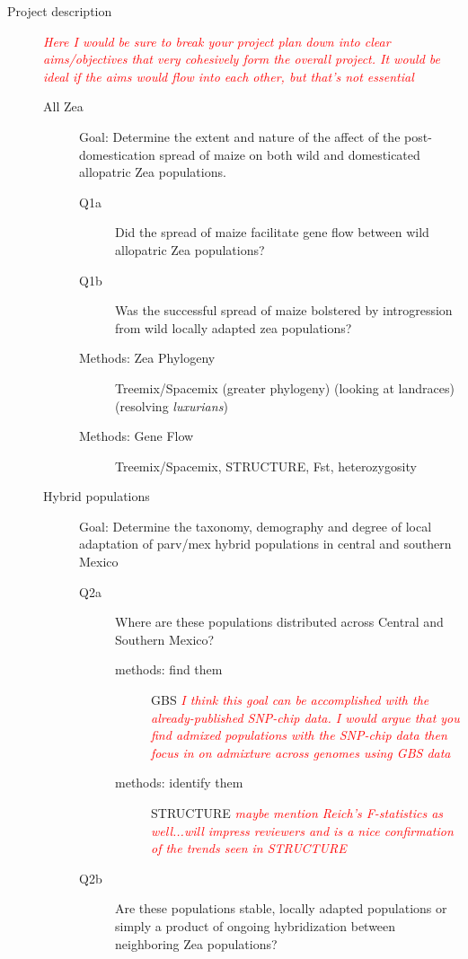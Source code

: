 \documentclass[11pt]{amsart}
\newcommand{\mbh}[1]{\textcolor{red}{ \emph{\scriptsize  #1}} }
\begin{document}
\begin{description}
\begin{itemize}
		\end{itemize}
	\item[Project description] \hfill
	\mbh{Here I would be sure to break your project plan down into clear aims/objectives that very cohesively form the overall project.  It would be ideal if the aims would flow into each other, but that's not essential}
		\begin{description}
			\item[All Zea] Goal: Determine the extent and nature of the affect of the post-domestication spread of maize on both wild and domesticated allopatric Zea populations.
				\begin{description}
					\item[Q1a] Did the spread of maize facilitate gene flow between wild allopatric Zea populations?
					\item[Q1b]  Was the successful spread of maize bolstered by introgression from wild locally adapted zea populations?
					\item[Methods: Zea Phylogeny] Treemix/Spacemix (greater phylogeny) (looking at landraces) (resolving \emph{luxurians})
					\item[Methods: Gene Flow] Treemix/Spacemix, STRUCTURE, Fst, heterozygosity
				\end{description}
			\item[Hybrid populations] Goal: Determine the taxonomy, demography and degree of local adaptation of parv/mex hybrid populations in central and southern Mexico
				\begin{description}
					\item[Q2a] Where are these populations distributed across Central and Southern Mexico?
						\begin{description}
							\item[methods: find them] GBS \mbh{I think this goal can be accomplished with the already-published SNP-chip data.  I would argue that you find admixed populations with the SNP-chip data then focus in on admixture across genomes using GBS data}
							\item[methods: identify them] STRUCTURE \mbh{maybe mention Reich's F-statistics as well...will impress reviewers and is a nice confirmation of the trends seen in STRUCTURE}
						\end{description}
					\item[Q2b] Are these populations stable, locally adapted populations or simply a product of ongoing hybridization between neighboring Zea populations?
						\begin{description}

\end{description}
\end{description}
\end{description}
\end{description}
\end{document}
